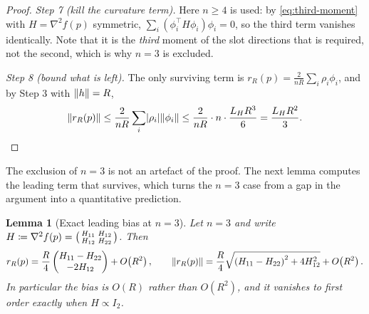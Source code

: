 \documentclass[11pt,a4paper]{article}
\theoremstyle{plain}
\newtheorem{lemma}{Lemma}
\theoremstyle{definition}
\DeclarePairedDelimiter{\norm}{\lVert}{\rVert}
\DeclarePairedDelimiter{\abs}{\lvert}{\rvert}
\begin{document}
\begin{proof}
\emph{Step 7 (kill the curvature term).} Here $n\geq4$ is used: by \eqref{eq:third-moment} with
$H=\nabla^2f(p)$ symmetric, $\sum_i\left(\phi_i^{\top}H\phi_i\right)\phi_i=0$, so the third term
vanishes identically. Note that it is the \emph{third} moment of the slot directions that is
required, not the second, which is why $n=3$ is excluded.

\emph{Step 8 (bound what is left).} The only surviving term is
$r_R(p)=\frac{2}{nR}\sum_i\rho_i\phi_i$, and by Step 3 with $\norm{h}=R$,
\begin{equation*}
    \norm{r_R(p)}
    \leq\frac{2}{nR}\sum_i\abs{\rho_i}\norm{\phi_i}
    \leq\frac{2}{nR}\cdot n\cdot\frac{L_HR^3}{6}
    =\frac{L_HR^2}{3}. \qedhere
\end{equation*}
\end{proof}

The exclusion of $n=3$ is not an artefact of the proof. The next lemma computes the leading term
that survives, which turns the $n=3$ case from a gap in the argument into a quantitative
prediction.

\begin{lemma}[Exact leading bias at $n=3$]\label{lem:n3-bias}
Let $n=3$ and write $H\coloneqq\nabla^2f(p)=\begin{psmallmatrix}H_{11}&H_{12}\\H_{12}&H_{22}\end{psmallmatrix}$.
Then
\begin{equation}\label{eq:n3-bias-vector}
    r_R(p)=\frac R4
    \begin{pmatrix}H_{11}-H_{22}\\-2H_{12}\end{pmatrix}
    +O\!\left(R^2\right),
    \qquad
    \norm{r_R(p)}=\frac R4\sqrt{\left(H_{11}-H_{22}\right)^2+4H_{12}^2}+O\!\left(R^2\right).
\end{equation}
In particular the bias is $O(R)$ rather than $O(R^2)$, and it vanishes to first order exactly
when $H\propto I_2$.
\end{lemma}
\end{document}

